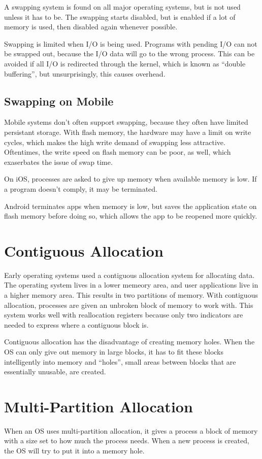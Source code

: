 \documentclass{article}
\begin{document}
A swapping system is found on all major operating systems, but is not used
unless it has to be. The swapping starts disabled, but is enabled if a lot of
memory is used, then disabled again whenever possible.

Swapping is limited when I/O is being used. Programs with pending I/O can not
be swapped out, because the I/O data will go to the wrong process. This can be
avoided if all I/O is redirected through the kernel, which is known as ``double
buffering'', but unsurprisingly, this causes overhead.

\subsection{Swapping on Mobile}
Mobile systems don't often support swapping, because they often have limited
persistant storage. With flash memory, the hardware may have a limit on write
cycles, which makes the high write demand of swapping less attractive.
Oftentimes, the write speed on flash memory can be poor, as well, which
exaserbates the issue of swap time.

On iOS, processes are asked to give up memory when available memory is low.
If a program doesn't comply, it may be terminated.

Android terminates apps when memory is low, but saves the application state on
flash memory before doing so, which allows the app to be reopened more quickly.

\section{Contiguous Allocation}
Early operating systems used a contiguous allocation system for allocating
data. The operating system lives in a lower memeory area, and user applications
live in a higher memory area. This results in two partitions of memory.
With contiguous allocation, processes are given an unbroken block of memory to
work with. This system works well with reallocation registers because only two
indicators are needed to express where a contiguous block is.

Contiguous allocation has the disadvantage of creating memory holes. When
the OS can only give out memory in large blocks, it has to fit these blocks
intelligently into memory and ``holes'', small areas between blocks that are
essentially unusable, are created.

\section{Multi-Partition Allocation}
When an OS uses multi-partition allocation, it gives a process a block of
memory with a size set to how much the process needs. When a new process is
created, the OS will try to put it into a memory hole.
\end{document}
